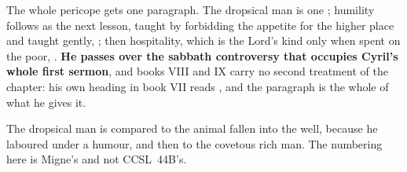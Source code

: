 \begin{witnessnote}
 The whole pericope gets
one paragraph. The dropsical man is one ; humility follows as the
next lesson, taught by forbidding the appetite for the higher place and taught
gently, ;
then hospitality, which is the Lord's kind only when spent on the poor,
. \textbf{He
passes over the sabbath controversy that occupies Cyril's whole first sermon},
and books VIII and IX carry no second treatment of the chapter: his own heading
in book VII reads , and the paragraph is the
whole of what he gives it.
\end{witnessnote}

\begin{witnessnote}
 The dropsical man
is compared to the animal fallen into the well, because he laboured under a
humour, and then to the covetous rich man. The numbering here is Migne's and not
CCSL~44B's.
\end{witnessnote}

